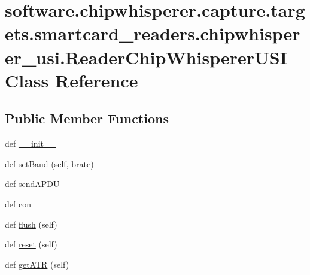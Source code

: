 \hypertarget{classsoftware_1_1chipwhisperer_1_1capture_1_1targets_1_1smartcard__readers_1_1chipwhisperer__usi_1_1ReaderChipWhispererUSI}{}\section{software.\+chipwhisperer.\+capture.\+targets.\+smartcard\+\_\+readers.\+chipwhisperer\+\_\+usi.\+Reader\+Chip\+Whisperer\+U\+S\+I Class Reference}
\label{classsoftware_1_1chipwhisperer_1_1capture_1_1targets_1_1smartcard__readers_1_1chipwhisperer__usi_1_1ReaderChipWhispererUSI}
\subsection*{Public Member Functions}
\begin{DoxyCompactItemize}
\item 
def \hyperlink{classsoftware_1_1chipwhisperer_1_1capture_1_1targets_1_1smartcard__readers_1_1chipwhisperer__usi_1_1ReaderChipWhispererUSI_a3ec2b886d290003b3d3ad88c4da7ca78}{\+\_\+\+\_\+init\+\_\+\+\_\+}
\item 
def \hyperlink{classsoftware_1_1chipwhisperer_1_1capture_1_1targets_1_1smartcard__readers_1_1chipwhisperer__usi_1_1ReaderChipWhispererUSI_a00a1cc6b550ee5aa5899571083294438}{set\+Baud} (self, brate)
\item 
def \hyperlink{classsoftware_1_1chipwhisperer_1_1capture_1_1targets_1_1smartcard__readers_1_1chipwhisperer__usi_1_1ReaderChipWhispererUSI_a2df2aa799a6ca8496348ea9f07bf3f00}{send\+A\+P\+D\+U}
\item 
def \hyperlink{classsoftware_1_1chipwhisperer_1_1capture_1_1targets_1_1smartcard__readers_1_1chipwhisperer__usi_1_1ReaderChipWhispererUSI_adb7c0ea0ea73ec13f09671e803cef5f8}{con}
\item 
def \hyperlink{classsoftware_1_1chipwhisperer_1_1capture_1_1targets_1_1smartcard__readers_1_1chipwhisperer__usi_1_1ReaderChipWhispererUSI_a25559014cfdd8cc77cd0dacbe19708f2}{flush} (self)
\item 
def \hyperlink{classsoftware_1_1chipwhisperer_1_1capture_1_1targets_1_1smartcard__readers_1_1chipwhisperer__usi_1_1ReaderChipWhispererUSI_a7398260e85f59140804472589f3f4aba}{reset} (self)
\item 
def \hyperlink{classsoftware_1_1chipwhisperer_1_1capture_1_1targets_1_1smartcard__readers_1_1chipwhisperer__usi_1_1ReaderChipWhispererUSI_acfc860a007d1b80769104e67eb716330}{get\+A\+T\+R} (self)
\end{DoxyCompactItemize}
